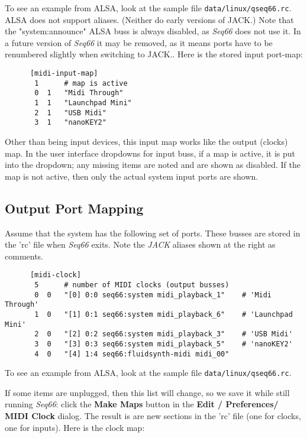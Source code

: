    To see an example from ALSA, look at the sample file
   \texttt{data/linux/qseq66.rc}.
   ALSA does not support aliases.
   (Neither do early versions of JACK.)
   Note that the "system:announce" ALSA buss is always disabled,
   as \textsl{Seq66} does not use it.
   In a future version of \textsl{Seq66} it may be removed, as it means ports
   have to be renumbered slightly when switching to JACK..
   Here is the stored input port-map:

   \begin{verbatim}
      [midi-input-map]
       1      # map is active
       0  1   "Midi Through"
       1  1   "Launchpad Mini"
       2  1   "USB Midi"
       3  1   "nanoKEY2"
   \end{verbatim}

   Other than being input devices, this input map works like the output
   (clocks) map.
   In the user interface dropdowns for input buss, if a map is active, it is
   put into the dropdown; any missing items are noted and are shown as
   disabled.
   If the map is not active, then only the actual system input ports are shown.

\subsection{Output Port Mapping}
\label{subsec:output_port_mapping}

   Assume that the system has the following set of ports.  These busses are
   stored in the 'rc' file when \textsl{Seq66} exits.  Note the \textsl{JACK}
   aliases shown at the right as comments.

   \begin{verbatim}
      [midi-clock]
       5      # number of MIDI clocks (output busses)
       0  0   "[0] 0:0 seq66:system midi_playback_1"    # 'Midi Through'
       1  0   "[1] 0:1 seq66:system midi_playback_6"    # 'Launchpad Mini'
       2  0   "[2] 0:2 seq66:system midi_playback_3"    # 'USB Midi'
       3  0   "[3] 0:3 seq66:system midi_playback_5"    # 'nanoKEY2'
       4  0   "[4] 1:4 seq66:fluidsynth-midi midi_00"
   \end{verbatim}

   To see an example from ALSA, look at the sample file
   \texttt{data/linux/qseq66.rc}.

   If some items are unplugged, then this list will change, so we save it while
   still running \textsl{Seq66}:
   click the
   \textbf{Make Maps} button in the
   \textbf{Edit / Preferences/ MIDI Clock} dialog. 
   The result is are new sections in the 'rc' file (one for clocks, one for
   inputs).  Here is the clock map:

